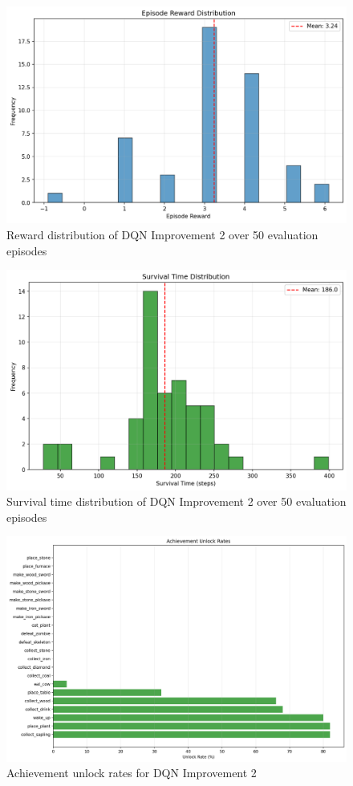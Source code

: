 \documentclass[twocolumn]{article}
\begin{document}
\begin{figure}[H]
	\centering
	\includegraphics[width=0.8\linewidth]{images/DQNImprov2reward_distribution.png}
	\caption{Reward distribution of DQN Improvement 2 over 50 evaluation episodes}
	\label{fig:dqn_improv2_reward}
\end{figure}

\begin{figure}[H]
	\centering
	\includegraphics[width=0.8\linewidth]{images/DQNImprov2survival_distribution.png}
	\caption{Survival time distribution of DQN Improvement 2 over 50 evaluation episodes}
	\label{fig:dqn_improv2_survival}
\end{figure}
\begin{figure}[H]
	\centering
	\includegraphics[width=0.8\linewidth]{images/DQNImprov2achievement_rates.png}
	\caption{Achievement unlock rates for DQN Improvement 2}
	\label{fig:dqn_improv2_achievements}
\end{figure}
\end{document}
